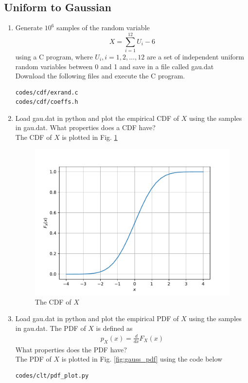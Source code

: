 \subsection{Uniform to Gaussian}
\begin{enumerate}[label=\thesubsection.\arabic*
,ref=\thesection.\theenumi]

\item
Generate $10^6$ samples of the random variable
%
\begin{equation}
X = \sum_{i=1}^{12}U_i -6
\end{equation}
%
using a C program, where $U_i, i = 1,2,\dots, 12$ are  a set of independent uniform random variables between 0 and 1
and save in a file called gau.dat
\\
\solution Download the following files and execute the  C program.
\begin{lstlisting}
codes/cdf/exrand.c
codes/cdf/coeffs.h
\end{lstlisting}

%
\item
Load gau.dat in python and plot the empirical CDF of $X$ using the samples in gau.dat. What properties does a CDF have?
\\
\solution The CDF of $X$ is plotted in Fig. \ref{fig:gauss_cdf}
\begin{figure}
\centering
\includegraphics[width=\columnwidth]{./figs/clt/gauss_cdf}
\caption{The CDF of $X$}
\label{fig:gauss_cdf}
\end{figure}


\item
Load gau.dat in python and plot the empirical PDF of $X$ using the samples in gau.dat. The PDF of $X$ is defined as
\begin{align}
p_{X}(x) = \frac{d}{dx}F_{X}(x)
\end{align}
What properties does the PDF have?
\\
\solution The PDF of $X$ is plotted in Fig. \ref{fig:gauss_pdf} using the code below
\begin{lstlisting}
codes/clt/pdf_plot.py
\end{lstlisting}


\end{enumerate}
